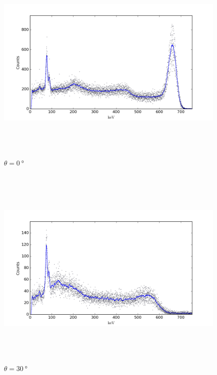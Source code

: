 \documentclass[a4paper]{scrartcl}
\begin{document}
\begin{figure}
    \centering
    \includegraphics[height = 10cm]{data/0.png}
    \caption{\(\theta = \SI{0}{\degree}\)}
    \label{fig:0}
\end{figure}
\begin{figure}
    \centering
    \includegraphics[height = 10cm]{data/30.png}
    \caption{\(\theta = \SI{30}{\degree}\)}
    \label{fig:30}
\end{figure}
\end{document}
